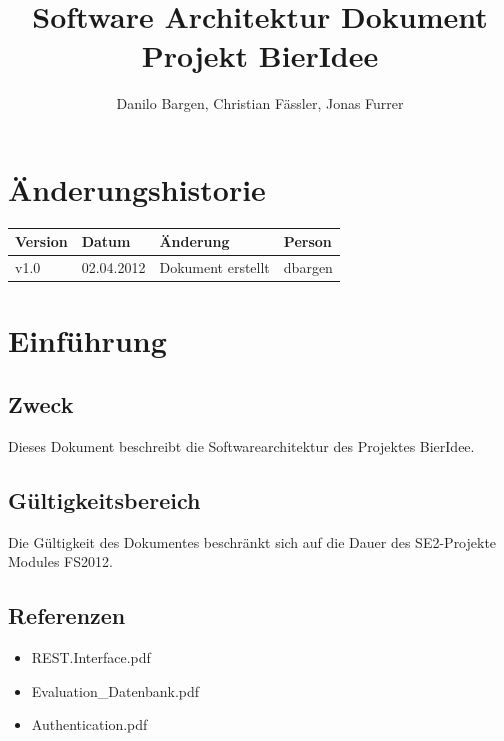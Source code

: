 \documentclass[10pt,a4paper]{scrartcl}
\author{Danilo Bargen, Christian Fässler, Jonas Furrer}
\title{Software Architektur Dokument\\ Projekt BierIdee}
\begin{document}
\begin{titlepage}
	\maketitle
	\vspace{120mm}
	\thispagestyle{empty} %
\end{titlepage}

\tableofcontents
\newpage

\section*{Änderungshistorie}
\begin{tabular}{p{}p{}p{}p{}}
\toprule
\textbf{Version} & \textbf{Datum} & \textbf{Änderung} & \textbf{Person} \\  
\midrule
v1.0 & 02.04.2012 & Dokument erstellt & dbargen \\  
\bottomrule
\end{tabular} 
\newpage

\section{Einführung}

\subsection{Zweck}
Dieses Dokument beschreibt die Softwarearchitektur des Projektes BierIdee.

\subsection{Gültigkeitsbereich}
Die Gültigkeit des Dokumentes beschränkt sich auf die Dauer des SE2-Projekte Modules FS2012.

\subsection{Referenzen}

\begin{itemize}
	\item REST.Interface.pdf
	\item Evaluation_Datenbank.pdf
	\item Authentication.pdf
\end{itemize}
\end{document}
